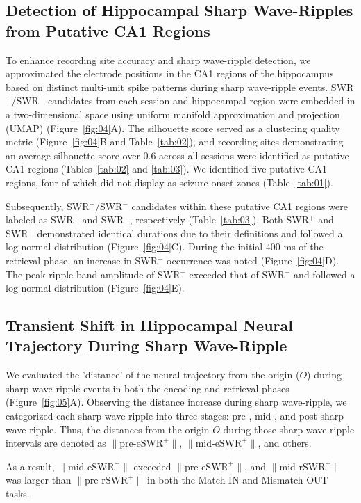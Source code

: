 \documentclass[final,3p,times,twocolumn]{elsarticle}
\begin{document}
\subsection{Detection of Hippocampal Sharp Wave-Ripples from Putative CA1 Regions}
To enhance recording site accuracy and sharp wave-ripple detection, we approximated the electrode positions in the CA1 regions of the hippocampus based on distinct multi-unit spike patterns during sharp wave-ripple events. SWR$^+$/SWR$^-$ candidates from each session and hippocampal region were embedded in a two-dimensional space using uniform manifold approximation and projection (UMAP) (Figure~\ref{fig:04}A). The silhouette score served as a clustering quality metric (Figure~\ref{fig:04}B and Table~\ref{tab:02}), and recording sites demonstrating an average silhouette score over 0.6 across all sessions were identified as putative CA1 regions (Tables~\ref{tab:02} and \ref{tab:03}). We identified five putative CA1 regions, four of which did not display as seizure onset zones (Table~\ref{tab:01}).

Subsequently, SWR$^+$/SWR$^-$ candidates within these putative CA1 regions were labeled as SWR$^+$ and SWR$^-$, respectively (Table~\ref{tab:03}). Both SWR$^+$ and SWR$^-$ demonstrated identical durations due to their definitions and followed a log-normal distribution (Figure~\ref{fig:04}C). During the initial 400 ms of the retrieval phase, an increase in SWR$^+$ occurrence was noted (Figure~\ref{fig:04}D). The peak ripple band amplitude of SWR$^+$ exceeded that of SWR$^-$ and followed a log-normal distribution (Figure~\ref{fig:04}E).

\subsection{Transient Shift in Hippocampal Neural Trajectory During Sharp Wave-Ripple}
We evaluated the 'distance' of the neural trajectory from the origin ($O$) during sharp wave-ripple events in both the encoding and retrieval phases (Figure~\ref{fig:05}A). Observing the distance increase during sharp wave-ripple, we categorized each sharp wave-ripple into three stages: pre-, mid-, and post-sharp wave-ripple. Thus, the distances from the origin $O$ during those sharp wave-ripple intervals are denoted as $\mathrm{\lVert \text{pre-eSWR}^+ \rVert}$, $\mathrm{\lVert \text{mid-eSWR}^+ \rVert}$, and others.

As a result, $\mathrm{\lVert \text{mid-eSWR}^+ \rVert}$ exceeded $\mathrm{\lVert \text{pre-eSWR}^+ \rVert}$, and $\mathrm{\lVert \text{mid-rSWR}^+ \rVert}$ was larger than $\mathrm{\lVert \text{pre-rSWR}^+ \rVert}$ in both the Match IN and Mismatch OUT tasks.
\end{document}
